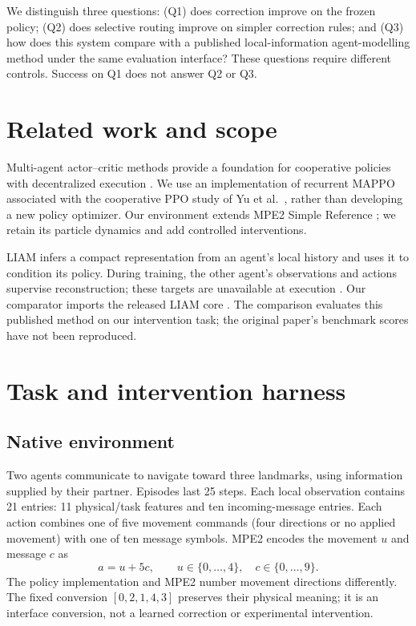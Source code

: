 \documentclass[10pt,a4paper]{article}
\begin{document}
We distinguish three questions: (Q1) does correction improve on the frozen policy; (Q2) does selective routing improve on simpler correction rules; and (Q3) how does this system compare with a published local-information agent-modelling method under the same evaluation interface? These questions require different controls. Success on Q1 does not answer Q2 or Q3.

\section{Related work and scope}
Multi-agent actor--critic methods provide a foundation for cooperative policies with decentralized execution \cite{lowe2017}. We use an implementation of recurrent MAPPO associated with the cooperative PPO study of Yu et al.\ \cite{yu2022}, rather than developing a new policy optimizer. Our environment extends MPE2 Simple Reference \cite{mpe2}; we retain its particle dynamics and add controlled interventions.

LIAM infers a compact representation from an agent's local history and uses it to condition its policy. During training, the other agent's observations and actions supervise reconstruction; these targets are unavailable at execution \cite{papoudakis2021}. Our comparator imports the released LIAM core \cite{liamcode}. The comparison evaluates this published method on our intervention task; the original paper's benchmark scores have not been reproduced.

\section{Task and intervention harness}
\subsection{Native environment}
Two agents communicate to navigate toward three landmarks, using information supplied by their partner. Episodes last 25 steps. Each local observation contains 21 entries: 11 physical/task features and ten incoming-message entries. Each action combines one of five movement commands (four directions or no applied movement) with one of ten message symbols. MPE2 encodes the movement $u$ and message $c$ as
\begin{equation}
 a = u + 5c,\qquad u\in\{0,\ldots,4\},\quad c\in\{0,\ldots,9\}.
\end{equation}
The policy implementation and MPE2 number movement directions differently. The fixed conversion $[0,2,1,4,3]$ preserves their physical meaning; it is an interface conversion, not a learned correction or experimental intervention.
\end{document}
